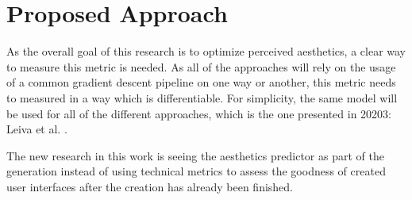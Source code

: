 \documentclass[10pt,a4paper]{scrartcl} %
\begin{document}
\section{Proposed Approach}
\label{sec:approach}
As the overall goal of this research is to optimize
perceived aesthetics, a clear way to measure this metric is needed. As all of the approaches will rely on the usage of a
common gradient descent pipeline on one way or another, this metric needs to measured in a way which is differentiable. For simplicity, the same model will be used for all of the different approaches, which is the one presented in
20203: Leiva et al. \cite{Leiva2023}. 
\iffalse
However, a slight modification will be necessary as the provided pre-trained model is
using the tensorflow \footnote{\url{https://www.tensorflow.org}} framework and therefore not compatible with the torch \footnote{\url{https://pytorch.org}}
autograd mechanisms used in this research. Thus, the model will be retrained on the same data using the same presented model architecture
which should yield similar results to the ones presented in the research.
\fi

The new research in this work is seeing the aesthetics predictor as part of the generation instead of using technical metrics to assess the goodness of created user interfaces after the creation has already been finished.

\end{document}
